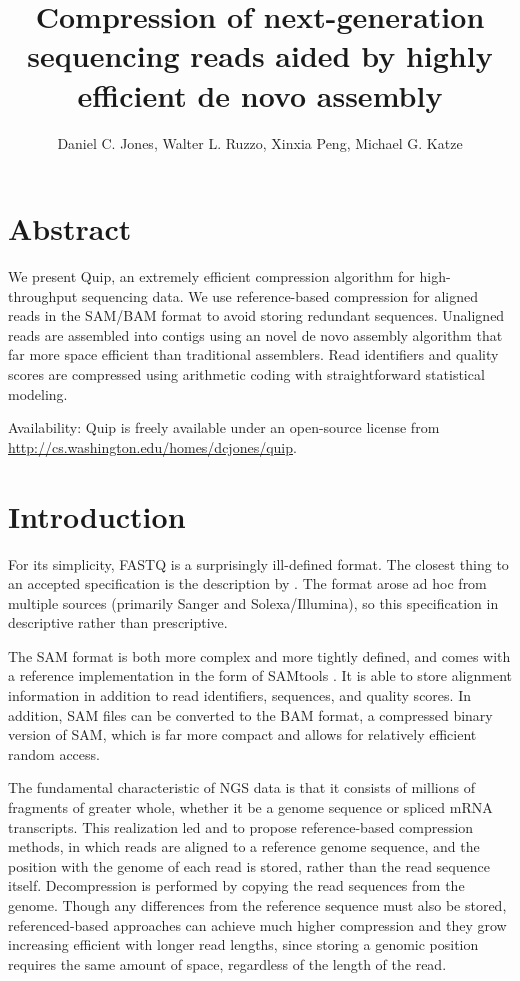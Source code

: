 \documentclass[twocolumn]{article}
\title{Compression of next-generation sequencing reads aided by highly efficient de novo assembly}
\author{Daniel C. Jones, Walter L. Ruzzo, Xinxia Peng, Michael G. Katze}
\begin{document}
\maketitle

\section{Abstract}

We present Quip, an extremely efficient compression algorithm for
high-throughput sequencing data.  We use reference-based compression for aligned
reads in the SAM/BAM format to avoid storing redundant sequences.  Unaligned
reads are assembled into contigs using an novel de novo assembly algorithm that
far more space efficient than traditional assemblers.  Read identifiers and
quality scores are compressed using arithmetic coding with straightforward
statistical modeling.

Availability: Quip is freely available under an open-source license from
\url{http://cs.washington.edu/homes/dcjones/quip}.


\section{Introduction}




For its simplicity, FASTQ is a surprisingly ill-defined format. The closest
thing to an accepted specification is the description by \citet{Cock2010}. The
format arose ad hoc from multiple sources (primarily Sanger and
Solexa/Illumina), so this specification in descriptive rather than
prescriptive.

The SAM format is both more complex and more tightly defined, and comes with a
reference implementation in the form of SAMtools \citep{Li2009b}. It is able to
store alignment information in addition to read identifiers, sequences, and
quality scores. In addition, SAM files can be converted to the BAM format, a
compressed binary version of SAM, which is far more compact and allows for
relatively efficient random access. 




The fundamental characteristic of NGS data is that it consists of millions of
fragments of greater whole, whether it be a genome sequence or spliced mRNA
transcripts. This realization led \citet{Kozanitis2011} and \citet{Hsi-
YangFritz2011} to propose reference-based compression methods, in which reads
are aligned to a reference genome sequence, and the position with the genome
of each read is stored, rather than the read sequence itself. Decompression is
performed by copying the read sequences from the genome. Though any
differences from the reference sequence must also be stored, referenced-based
approaches can achieve much higher compression and they grow increasing
efficient with longer read lengths, since storing a genomic position requires
the same amount of space, regardless of the length of the read.
\end{document}
